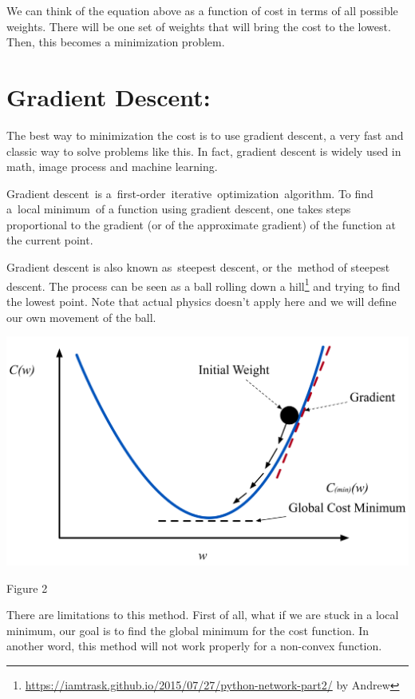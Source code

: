 \documentclass[]{article}
\begin{document}
\begin{multicols}{2}
We can think of the equation above as a function of cost in terms of all
possible weights. There will be one set of weights that will bring the
cost to the lowest. Then, this becomes a minimization problem.

\section{Gradient Descent:}

The best way to minimization the cost is to use gradient descent, a very
fast and classic way to solve problems like this. In fact, gradient
descent is widely used in math, image process and machine learning.

Gradient descent~is a~first-order~iterative~optimization~algorithm. To
find a~local minimum~of a function using gradient descent, one takes
steps proportional to the gradient (or of the
approximate gradient) of the function at the current point.

Gradient descent is also known as~steepest descent, or the~method of
steepest descent. The process can be seen as a ball rolling down a
hill\footnote{\url{https://iamtrask.github.io/2015/07/27/python-network-part2/}
  by Andrew}
and trying to find the lowest point. Note that actual physics doesn't
apply here and we will define our own movement of the ball.

\centerline{\includegraphics[width=1\linewidth]{gd} }
\centerline{Figure 2}
\vspace{0.5cm}

There are limitations to this method. First of all, what if we are stuck
in a local minimum, our goal is to find the global minimum for the cost
function. In another word, this method will not work properly for a non-convex
function. 


\end{multicols}
\end{document}
